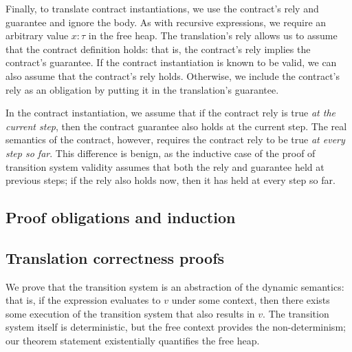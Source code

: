Finally, to translate contract instantiations, we use the contract's rely and guarantee and ignore the body.
As with recursive expressions, we require an arbitrary value $x: \tau$ in the free heap.
The translation's rely allows us to assume that the contract definition holds: that is, the contract's rely implies the contract's guarantee.
If the contract instantiation is known to be valid, we can also assume that the contract's rely holds.
Otherwise, we include the contract's rely as an obligation by putting it in the translation's guarantee.

In the contract instantiation, we assume that if the contract rely is true \emph{at the current step}, then the contract guarantee also holds at the current step.
The real semantics of the contract, however, requires the contract rely to be true \emph{at every step so far}.
This difference is benign, as the inductive case of the proof of transition system validity assumes that both the rely and guarantee held at previous steps; if the rely also holds now, then it has held at every step so far.

\subsection{Proof obligations and induction}
\label{s:transition:ind}


\subsection{Translation correctness proofs}
\label{s:transition:proof}

We prove that the transition system is an abstraction of the dynamic semantics: that is, if the expression evaluates to $v$ under some context, then there exists some execution of the transition system that also results in $v$.
The transition system itself is deterministic, but the free context provides the non-determinism; our theorem  statement existentially quantifies the free heap.



